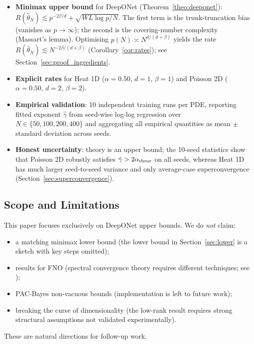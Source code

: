 \documentclass[12pt,a4paper]{article}
\begin{document}
\begin{itemize}
    \item[C1] \textbf{Minimax upper bound} for DeepONet (Theorem~\ref{theo:deeponet}):
        $R(\hat\theta_N) \lesssim p^{-2\beta/d} + \sqrt{WL\log p/N}$.
        The first term is the trunk-truncation bias (vanishes as $p\to\infty$);
        the second is the covering-number complexity (Massart's lemma).
        Optimising $p(N)\asymp N^{d/(d+\beta)}$ yields the rate
        $R(\hat\theta_N)\lesssim N^{-2\beta/(d+\beta)}$
        (Corollary~\ref{cor:rates}); see Section~\ref{sec:proof_ingredients}.
    \item[C2] \textbf{Explicit rates} for Heat 1D ($\alpha=0.50$, $d=1$, $\beta=1$)
        and Poisson 2D ($\alpha=0.50$, $d=2$, $\beta=2$).
    \item[C3] \textbf{Empirical validation}: 10 independent training runs per PDE,
        reporting fitted exponent $\hat\gamma$ from seed-wise log-log regression
        over $N \in \{50, 100, 200, 400\}$ and aggregating all empirical quantities
        as mean $\pm$ standard deviation across seeds.
    \item[C4] \textbf{Honest uncertainty}: theory is an upper bound;
        the 10-seed statistics show that Poisson 2D robustly satisfies
        $\hat\gamma > 2\alpha_{\rm theor}$ on all seeds, whereas Heat 1D has much
        larger seed-to-seed variance and only average-case superconvergence
        (Section~\ref{sec:superconvergence}).
\end{itemize}

\subsection{Scope and Limitations}
\label{sec:scope}

This paper focuses exclusively on DeepONet upper bounds.
We do \emph{not} claim:
\begin{itemize}
    \item a matching minimax lower bound (the lower bound in Section~\ref{sec:lower}
        is a sketch with key steps omitted);
    \item results for FNO (spectral convergence theory requires different techniques;
        see \citet{kovachki2021fno,lanthaler2024holomorphic});
    \item PAC-Bayes non-vacuous bounds (implementation is left to future work);
    \item breaking the curse of dimensionality (the low-rank result requires
        strong structural assumptions not validated experimentally).
\end{itemize}
These are natural directions for follow-up work.
\end{document}
